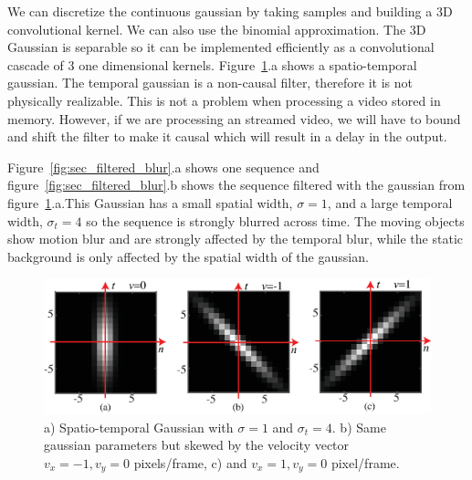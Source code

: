 We can discretize the continuous gaussian by taking samples and building a 3D convolutional kernel. We can also use the binomial approximation. The 3D Gaussian is separable so it can be implemented efficiently as a convolutional cascade of 3 one dimensional kernels. Figure~\ref{fig:seq_filtered_kernel}.a shows a spatio-temporal gaussian. The temporal gaussian is a non-causal filter, therefore it is not physically realizable. This is not a problem when processing a video stored in memory. However, if we are processing an streamed video, we will have to bound and shift the filter to make it causal which will result in a delay in the output. 

Figure~\ref{fig:sec_filtered_blur}.a shows one sequence and figure~\ref{fig:sec_filtered_blur}.b shows the sequence filtered with the gaussian from figure~\ref{fig:seq_filtered_kernel}.a.This Gaussian has a small spatial width, $\sigma=1$, and a large temporal width, $\sigma_t=4$ so the sequence is strongly blurred across time. The moving objects show motion blur and are strongly affected by the temporal blur, while the static background is only affected by the spatial width of the gaussian.

\begin{figure}
\includegraphics[width=1\linewidth]{figures/temporal_filters/seq_filtered_kernel.eps}
\caption{a) Spatio-temporal Gaussian with $\sigma=1$ and $\sigma_t=4$.  b) Same gaussian parameters but skewed by the velocity vector $v_x=-1, v_y=0$ pixels/frame, c) and $v_x=1, v_y=0$ pixel/frame.} 
\label{fig:seq_filtered_kernel}
\end{figure}

